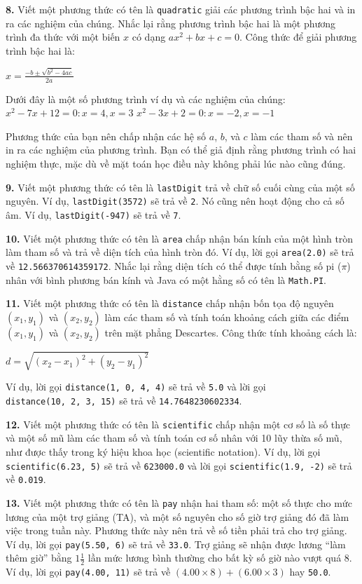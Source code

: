 \textbf{8.} Viết một phương thức có tên là \texttt{quadratic} giải các
phương trình bậc hai và in ra các nghiệm của chúng. Nhắc lại rằng phương
trình bậc hai là một phương trình đa thức với một biến \(x\) có dạng
\(ax^2 + bx + c = 0\). Công thức để giải phương trình bậc hai là:

\(x = \frac{-b \pm \sqrt{b^2 - 4ac}}{2a}\)

Dưới đây là một số phương trình ví dụ và các nghiệm của chúng:
\(x^2 - 7x + 12 = 0 : x = 4, x = 3\)
\(x^2 - 3x + 2 = 0 : x = -2, x = -1\)

Phương thức của bạn nên chấp nhận các hệ số \(a\), \(b\), và \(c\) làm
các tham số và nên in ra các nghiệm của phương trình. Bạn có thể giả
định rằng phương trình có hai nghiệm thực, mặc dù về mặt toán học điều
này không phải lúc nào cũng đúng.

\textbf{9.} Viết một phương thức có tên là \texttt{lastDigit} trả về chữ
số cuối cùng của một số nguyên. Ví dụ, \texttt{lastDigit(3572)} sẽ trả
về \texttt{2}. Nó cũng nên hoạt động cho cả số âm. Ví dụ,
\texttt{lastDigit(-947)} sẽ trả về \texttt{7}.

\textbf{10.} Viết một phương thức có tên là \texttt{area} chấp nhận bán
kính của một hình tròn làm tham số và trả về diện tích của hình tròn đó.
Ví dụ, lời gọi \texttt{area(2.0)} sẽ trả về \texttt{12.566370614359172}.
Nhắc lại rằng diện tích có thể được tính bằng số pi (\(\pi\)) nhân với
bình phương bán kính và Java có một hằng số có tên là \texttt{Math.PI}.

\textbf{11.} Viết một phương thức có tên là \texttt{distance} chấp nhận
bốn tọa độ nguyên \((x_1, y_1)\) và \((x_2, y_2)\) làm các tham số và
tính toán khoảng cách giữa các điểm \((x_1, y_1)\) và \((x_2, y_2)\)
trên mặt phẳng Descartes. Công thức tính khoảng cách là:

\(d = \sqrt{(x_2 - x_1)^2 + (y_2 - y_1)^2}\)

Ví dụ, lời gọi \texttt{distance(1,\ 0,\ 4,\ 4)} sẽ trả về \texttt{5.0}
và lời gọi \texttt{distance(10,\ 2,\ 3,\ 15)} sẽ trả về
\texttt{14.7648230602334}.

\textbf{12.} Viết một phương thức có tên là \texttt{scientific} chấp
nhận một cơ số là số thực và một số mũ làm các tham số và tính toán cơ
số nhân với 10 lũy thừa số mũ, như được thấy trong ký hiệu khoa học
(scientific notation). Ví dụ, lời gọi \texttt{scientific(6.23,\ 5)} sẽ
trả về \texttt{623000.0} và lời gọi \texttt{scientific(1.9,\ -2)} sẽ trả
về \texttt{0.019}.

\textbf{13.} Viết một phương thức có tên là \texttt{pay} nhận hai tham
số: một số thực cho mức lương của một trợ giảng (TA), và một số nguyên
cho số giờ trợ giảng đó đã làm việc trong tuần này. Phương thức này nên
trả về số tiền phải trả cho trợ giảng. Ví dụ, lời gọi
\texttt{pay(5.50,\ 6)} sẽ trả về \texttt{33.0}. Trợ giảng sẽ nhận được
lương ``làm thêm giờ'' bằng \(1\frac{1}{2}\) lần mức lương bình thường
cho bất kỳ số giờ nào vượt quá 8. Ví dụ, lời gọi \texttt{pay(4.00,\ 11)}
sẽ trả về \((4.00 \times 8) + (6.00 \times 3)\) hay \texttt{50.0}.

